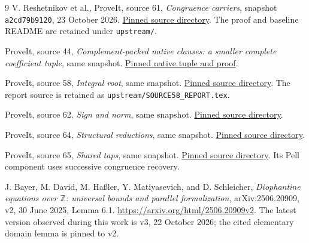 \documentclass[11pt]{article}
\newcommand{\Z}{\mathbb Z}
\theoremstyle{remark}
\begin{document}
\begin{thebibliography}{9}
V. Reshetnikov et al., ProveIt, source 61, \emph{Congruence carriers},
snapshot \texttt{a2cd79b9120}, 23 October 2026.
\href{https://github.com/VladimirReshetnikov/ProveIt/tree/a2cd79b9120fc75f48dcbef6e38d0f8b18d64d49/Computability/DiophantineConsistency/con-zfc-diophantine-forms/61-congruence-carriers}{Pinned source directory}.
The proof and baseline README are retained under \texttt{upstream/}.

ProveIt, source 44, \emph{Complement-packed native clauses: a smaller complete
coefficient tuple}, same snapshot.
\href{https://github.com/VladimirReshetnikov/ProveIt/tree/a2cd79b9120fc75f48dcbef6e38d0f8b18d64d49/Computability/DiophantineConsistency/con-zfc-diophantine-forms/44-b4-sparse/native}{Pinned native tuple and proof}.

ProveIt, source 58, \emph{Integral root}, same snapshot.
\href{https://github.com/VladimirReshetnikov/ProveIt/tree/a2cd79b9120fc75f48dcbef6e38d0f8b18d64d49/Computability/DiophantineConsistency/con-zfc-diophantine-forms/58-integral-root}{Pinned source directory}.
The report source is retained as \texttt{upstream/SOURCE58\_REPORT.tex}.

ProveIt, source 62, \emph{Sign and norm}, same snapshot.
\href{https://github.com/VladimirReshetnikov/ProveIt/tree/a2cd79b9120fc75f48dcbef6e38d0f8b18d64d49/Computability/DiophantineConsistency/con-zfc-diophantine-forms/62-sign-and-norm}{Pinned source directory}.

ProveIt, source 64, \emph{Structural reductions}, same snapshot.
\href{https://github.com/VladimirReshetnikov/ProveIt/tree/a2cd79b9120fc75f48dcbef6e38d0f8b18d64d49/Computability/DiophantineConsistency/con-zfc-diophantine-forms/64-structural-reductions}{Pinned source directory}.

ProveIt, source 65, \emph{Shared taps}, same snapshot.
\href{https://github.com/VladimirReshetnikov/ProveIt/tree/a2cd79b9120fc75f48dcbef6e38d0f8b18d64d49/Computability/DiophantineConsistency/con-zfc-diophantine-forms/65-shared-taps}{Pinned source directory}.
Its Pell component uses successive congruence recovery.

J. Bayer, M. David, M. Ha{\ss}ler, Y. Matiyasevich, and D. Schleicher,
\emph{Diophantine equations over $\Z$: universal bounds and parallel
formalization}, arXiv:2506.20909, v2, 30 June 2025, Lemma 6.1.
\url{https://arxiv.org/html/2506.20909v2}.
The latest version observed during this work is v3, 22 October 2026;
the cited elementary domain lemma is pinned to v2.
\end{thebibliography}
\end{document}
